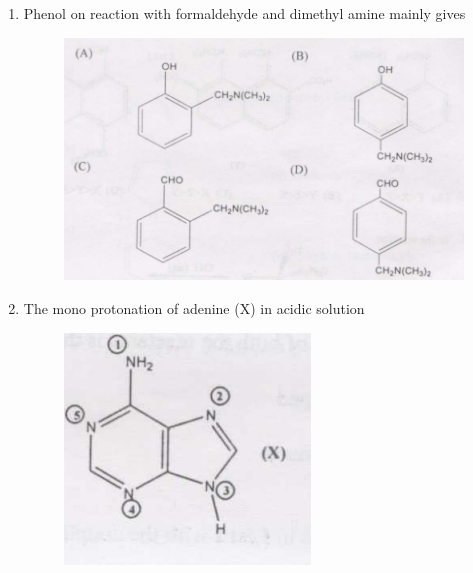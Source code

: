 \documentclass[journal,12pt,onecolumn]{IEEEtran}
\theoremstyle{remark}
\begin{document}
\begin{enumerate}
\begin{multicols}{2}
\begin{enumerate}
     \item   a-i \quad b-ii \quad c-iii
     \item   a-ii \quad b-iii \quad c-i
     \item   a-iii \quad b-ii \quad c-i
     \item   a-iii \quad b-i \quad c-ii
\end{enumerate}
\end{multicols}

\item  Phenol on reaction with formaldehyde and dimethyl amine mainly gives \hfill{}

\begin{figure}
    \centering
   \includegraphics[width=0.5\columnwidth]{figs/image4.png}
    \caption{}
    \label{fig:image4}
\end{figure}


  

\item  The mono protonation of adenine (X) in acidic solution \hfill{}

\begin{figure}
    \centering
    \includegraphics[width=0.5\columnwidth]{figs/image5.png}
    \caption{}
    \label{fig:figure5}
\end{figure}




\end{enumerate}
\end{document}
